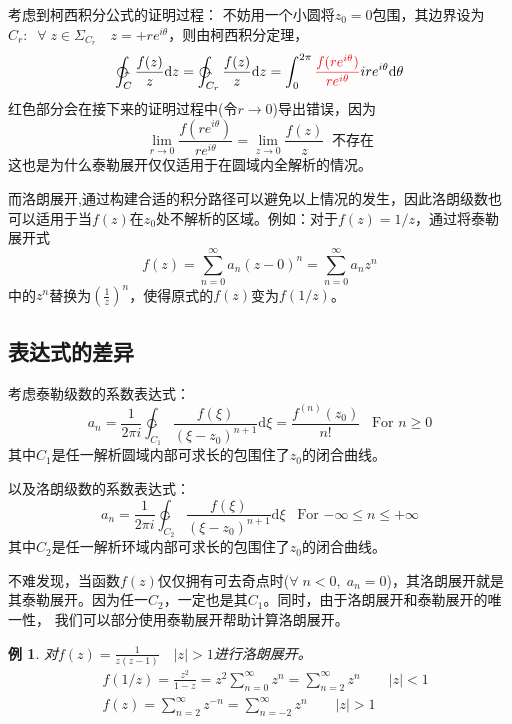 \documentclass[12pt, a4paper, oneside]{ctexart}
\newtheorem{example}[theorem]{例}
\def\D{\mathrm{d}}
\newcommand{\F}[1][z]
{\ensuremath{f(#1)}}
\begin{document}
考虑到柯西积分公式的证明过程：
不妨用一个小圆将$z_0=0$包围，其边界设为$\displaystyle C_r: \;\;\forall \; z\in \Sigma_{C_r}\quad z=+re^{i\theta}$，则由柯西积分定理，
\begin{align*}
    \ointctrclockwise_C \frac{\F}{z}\D z =\ointctrclockwise_{C_r}\frac{\F}{z}\D z =\int_0^{2\pi}{\color{red}\frac{\F[re^{i\theta}]}{re^{i\theta}}}ire^{i\theta}\D \theta
\end{align*}
{\color{red} 红色}部分会在接下来的证明过程中(令$r\to 0$)导出错误，因为
$$
    \lim_{r\to 0} \frac{\F[re^{i\theta}]}{re^{i\theta}} = \lim_{z\to 0} \frac{f(z)}{z} \;\; \text{不存在}
$$
这也是为什么泰勒展开仅仅适用于在圆域内全解析的情况。

而洛朗展开,通过构建合适的积分路径可以避免以上情况的发生，因此洛朗级数也可以适用于当$f(z)$在$z_0$处不解析的区域。例如：对于$f(z)=1/z$，通过将泰勒展开式
$$
    f(z)=\sum_{n=0}^\infty a_n(z-0)^n=\sum_{n=0}^\infty a_n z^n
$$
中的$z^n$替换为$\displaystyle(\frac{1}{z})^n$，使得原式的$f(z)$变为$f(1/z)$。

\subsection{表达式的差异}

考虑泰勒级数的系数表达式：
$$
    a_n=\frac{1}{2\pi i}\ointctrclockwise_{C_1} \frac{\F[\xi]}{(\xi-z_0)^{n+1}}\D \xi=\frac{f^{(n)}(z_0)}{n!}\;\;\; \text{For $n\ge 0$}
$$
其中$C_1$是任一解析圆域内部可求长的包围住了$z_0$的闭合曲线。

以及洛朗级数的系数表达式：
$$
    a_n=\frac{1}{2\pi i}\ointctrclockwise_{C_2} \frac{\F[\xi]}{(\xi-z_0)^{n+1}}\D \xi \;\;\; \text{For $-\infty \le n\le +\infty$}
$$
其中$C_2$是任一解析环域内部可求长的包围住了$z_0$的闭合曲线。

不难发现，当函数$f(z)$仅仅拥有可去奇点时($\forall \; n < 0, \;a_n=0$)，其洛朗展开就是其泰勒展开。因为任一$C_2$，一定也是其$C_1$。同时，由于洛朗展开和泰勒展开的唯一性，
我们可以部分使用泰勒展开帮助计算洛朗展开。
\begin{example}
    对$f(z)=\displaystyle \frac{1}{z(z-1)}\quad |z|>1$进行洛朗展开。
    \begin{align*}
        &f(1/z)=\frac{z^2}{1-z}=z^2 \sum_{n=0}^\infty z^n = \sum_{n=2}^\infty z^n \qquad |z|<1 \\
        &f(z)=\sum_{n=2}^\infty z^{-n}=\sum_{n=-2}^\infty z^n \qquad |z|>1
    \end{align*}
\end{example}
\end{document}
